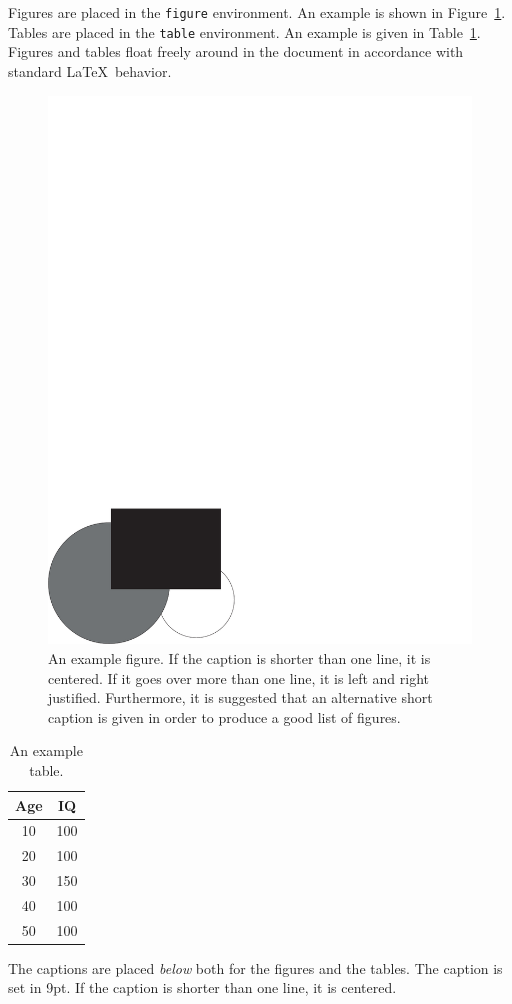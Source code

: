 Figures are placed in the \texttt{figure} environment. An example is
shown in Figure~\ref{fig:example}. %
Tables are placed in the \texttt{table} environment. An example is given in
Table~\ref{tab:example}. Figures and tables float freely around in the
document in accordance with standard \LaTeX\ behavior.

\begin{figure}[tbp]  %
  \centering
  \includegraphics[width=.5\textwidth]{figures/example_fig}
  \caption[An example figure.]{An example figure. If the caption is
    shorter than one line, it is centered. If it goes over more than
    one line, it is left and right justified. Furthermore, it is
    suggested that an alternative short caption is given in order to
    produce a good list of figures.}
  \label{fig:example}
\end{figure}

\begin{table}[tbp]
  \centering
  \begin{tabular}{c|c}
    Age  & IQ  \\ 
    \hline
    10   & 100 \\
    20   & 100 \\
    30   & 150 \\
    40   & 100 \\
    50   & 100
  \end{tabular}
  \caption{An example table.}
  \label{tab:example}
\end{table}

The captions are placed \emph{below} both for the figures and the
tables. The caption is set in 9pt. If the caption is shorter than one
line, it is centered.

